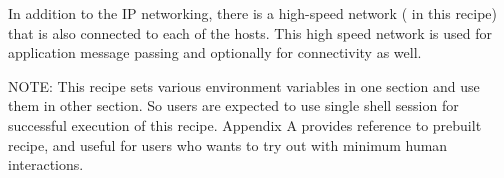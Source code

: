  In addition to the IP networking, there is a high-speed network
(\InfiniBand{} in this recipe) that is also connected to each of the
hosts. This high speed network is used for application message passing and
optionally for \Lustre{} connectivity as well.

NOTE: This recipe sets various environment variables in one section and use them 
in other section. So users are expected to use single shell session for successful 
execution of this recipe. Appendix A provides reference to prebuilt recipe, and 
useful for users who wants to try out with minimum human interactions.

